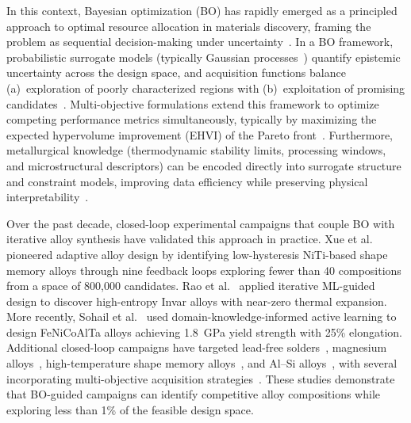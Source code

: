 \documentclass[preprint,12pt,times]{elsarticle}  %
\begin{document}

In this context, Bayesian optimization (BO) has rapidly emerged as a principled approach to optimal resource allocation in materials discovery, framing the problem as sequential decision-making under uncertainty~\cite{shahriari2016taking, frazier2018tutorial}. In a BO framework, probabilistic surrogate models (typically Gaussian processes~\cite{Rasmussen:2005:GPM:1162254}) quantify epistemic uncertainty across the design space, and acquisition functions balance (a)~exploration of poorly characterized regions with (b)~exploitation of promising candidates~\cite{snoek2012practical, arroyave2022perspective}. Multi-objective formulations extend this framework to optimize competing performance metrics simultaneously, typically by maximizing the expected hypervolume improvement (EHVI) of the Pareto front~\cite{emmerich2006single, zhao2018fast, mamun2025accelerated, hanaoka2022comparison}. Furthermore, metallurgical knowledge (thermodynamic stability limits, processing windows, and microstructural descriptors) can be encoded directly into surrogate structure and constraint models, improving data efficiency while preserving physical interpretability~\cite{khatamsaz2022multiobjective, vela2023data, paramore2025twoshot}.


Over the past decade, closed-loop experimental campaigns that couple BO with iterative alloy synthesis have validated this approach in practice. Xue et al.~\cite{xue2016accelerated} pioneered adaptive alloy design by identifying low-hysteresis NiTi-based shape memory alloys through nine feedback loops exploring fewer than 40 compositions from a space of 800{,}000 candidates. Rao et al.~\cite{rao2022machine} applied iterative ML-guided design to discover high-entropy Invar alloys with near-zero thermal expansion. More recently, Sohail et al.~\cite{sohail2025machine} used domain-knowledge-informed active learning to design FeNiCoAlTa alloys achieving 1.8~GPa yield strength with 25\% elongation. Additional closed-loop campaigns have targeted lead-free solders~\cite{wei2025discovering}, magnesium alloys~\cite{ghorbani2024active}, high-temperature shape memory alloys~\cite{tian2024noise}, and Al--Si alloys~\cite{cai2025process}, with several incorporating multi-objective acquisition strategies~\cite{wei2025discovering, li2022strength}. These studies demonstrate that BO-guided campaigns can identify competitive alloy compositions while exploring less than 1\% of the feasible design space.
\end{document}
